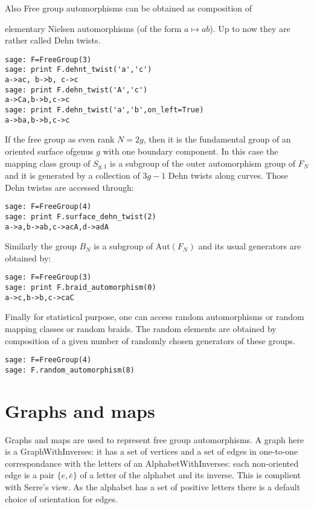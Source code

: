 \documentclass[10pt,a4paper]{article}
\newcommand{\Aut}{\text{Aut}}
\newcommand{\FN}{F_N}
\begin{document}
Also Free group automorphisms can be obtained as composition of
{elementary Nielsen automorphisms (of the form $a\mapsto
ab$). Up to now they are rather called Dehn twists.
\begin{verbatim}
sage: F=FreeGroup(3)
sage: print F.dehnt_twist('a','c')
a->ac, b->b, c->c
sage: print F.dehn_twist('A','c')
a->Ca,b->b,c->c
sage: print F.dehn_twist('a','b',on_left=True)
a->ba,b->b,c->c
\end{verbatim}

If the free group as even rank $N=2g$, then it is the fundamental
group of an oriented surface ofgenus $g$ with one boundary
component. In this case the mapping class group of $S_{g,1}$ is a
subgroup of the outer automorphism group of $F_N$ and it is generated
by a collection of $3g-1$ Dehn twists along curves. Those Dehn
twistss are accessed through:
\begin{verbatim}
sage: F=FreeGroup(4)
sage: print F.surface_dehn_twist(2)
a->a,b->ab,c->acA,d->adA
\end{verbatim}

Similarly the  group $B_N$ is a subgroup of $\Aut(\FN)$ and its usual generators are obtained by:
\begin{verbatim}
sage: F=FreeGroup(3)
sage: print F.braid_automorphism(0)
a->c,b->b,c->caC
\end{verbatim}

Finally for statistical purpose, one can access random
automorphisms or random mapping
classes or random braids. The random elements are obtained by composition of a given
number of randomly chosen generators of these groups.
\begin{verbatim}
sage: F=FreeGroup(4)
sage: F.random_automorphism(8)
\end{verbatim}

\section{Graphs and maps}

Graphs and maps are used to represent free group automorphisms. A
graph here is a GraphWithInverses: it has a set of vertices and a set
of edges in one-to-one correspondance with the letters of an
AlphabetWithInverses: each non-oriented edge is a pair $\{e,\bar e\}$
of a letter of the alphabet and its inverse. This is complient with
Serre's view. As the alphabet has a set of positive letters there is a
default choice of orientation for edges.

}
\end{document}
